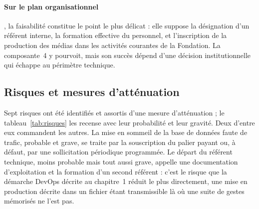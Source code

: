 \paragraph{Sur le plan organisationnel}, la faisabilité constitue le point le plus délicat : elle suppose la désignation d'un
référent interne, la formation effective du personnel, et l'inscription de la
production des médias dans les activités courantes de la Fondation. La composante~4 y pourvoit, mais son succès dépend d'une décision institutionnelle
qui échappe au périmètre technique.

\subsection{Risques et mesures d'atténuation}

Sept risques ont été identifiés et assortis d'une mesure d'atténuation ; le
tableau~\ref{tab:risques} les recense avec leur
probabilité et leur gravité. Deux d'entre eux commandent les autres. La mise en
sommeil de la base de données faute de trafic, probable et grave, se traite par
la souscription du palier payant ou, à défaut, par une sollicitation périodique
programmée. Le départ du référent technique, moins probable mais tout aussi
grave, appelle une documentation d'exploitation et la formation d'un second
référent : c'est le risque que la démarche DevOps décrite au chapitre~1 réduit
le plus directement, une mise en production décrite dans un fichier étant
transmissible là où une suite de gestes mémorisés ne l'est pas.

